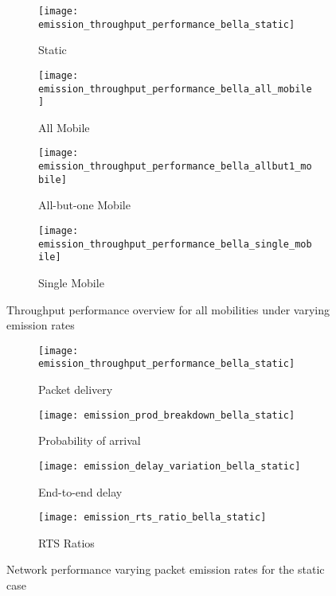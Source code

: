 \begin{figure}[h]
	\begin{subfigure}[t]{0.5\textwidth}
		\centering
		\texttt{[image: emission\_throughput\_performance\_bella\_static]}
		\caption{Static}
		\label{fig:emission_throughput_performance_sum_bella_static}
	\end{subfigure}
	\begin{subfigure}[t]{0.5\textwidth}
		\centering
		\texttt{[image: emission\_throughput\_performance\_bella\_all\_mobile]}
		\caption{All Mobile}
		\label{fig:emission_throughput_performance_sum_bella_all_mobile}
	\end{subfigure}  
	
	\begin{subfigure}[t]{0.5\textwidth}
		\centering
		\texttt{[image: emission\_throughput\_performance\_bella\_allbut1\_mobile]}
		\caption{All-but-one Mobile}
		\label{fig:emission_throughput_performance_sum_bella_allbut1_mobile}
	\end{subfigure}  
	\begin{subfigure}[t]{0.5\textwidth}
		\centering
		\texttt{[image: emission\_throughput\_performance\_bella\_single\_mobile]}
		\caption{Single Mobile}
		\label{fig:emission_throughput_performance_sum_bella_single_mobile}
	\end{subfigure}
	\caption{Throughput performance overview for all mobilities under varying emission rates}
	\label{fig:emission_all}
\end{figure}


\begin{figure}[tp!]
	\begin{subfigure}[t]{0.5\textwidth}
		\centering
		\texttt{[image: emission\_throughput\_performance\_bella\_static]}
		\caption{Packet delivery}
		\label{fig:emission_throughput_performance_bella_static}
	\end{subfigure}
	\begin{subfigure}[t]{0.5\textwidth}
		\centering
		\texttt{[image: emission\_prod\_breakdown\_bella\_static]}
		\caption{Probability of arrival}
		\label{fig:emission_prod_breakdown_bella_static}
	\end{subfigure}
	
	\begin{subfigure}[t]{0.5\textwidth}
		\centering
		\texttt{[image: emission\_delay\_variation\_bella\_static]}
		\caption{End-to-end delay}
		\label{fig:emission_delay_variation_bella_static}
	\end{subfigure}
	\begin{subfigure}[t]{0.5\textwidth}
		\centering
		\texttt{[image: emission\_rts\_ratio\_bella\_static]}
		\caption{RTS Ratios}
		\label{fig:emission_rts_ratio_bella_static}
	\end{subfigure}
	\caption{Network performance varying packet emission rates for the static case}
	\label{fig:emission_bella_static}
\end{figure}


